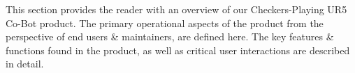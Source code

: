 
This section provides the reader with an overview of our Checkers-Playing UR5 Co-Bot product. The primary operational aspects of the product from the perspective of end users \& maintainers, are defined here. The key features \& functions found in the product, as well as critical user interactions are described in detail.

